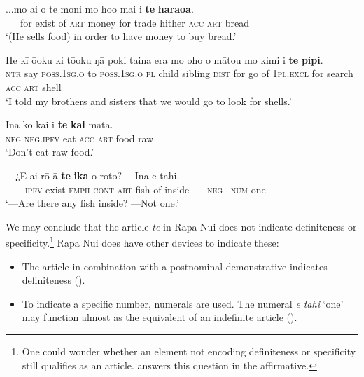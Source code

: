 \ea\label{ex:5.34}
\gll ...mo ai o te moni mo ho{\ꞌ}o mai i \textbf{te} \textbf{haraoa}. \\
~~~for exist of \textsc{art} money for trade hither \textsc{acc} \textsc{art} bread \\

\glt 
‘(He sells food) in order to have money to buy bread.’ \textstyleExampleref{[R156.023]} 
\z

\ea\label{ex:5.35}
\gll He kī ō{\ꞌ}oku ki tō{\ꞌ}oku ŋā poki taina era mo oho o mātou mo kimi i \textbf{te} \textbf{pipi}.\\
\textsc{ntr} say \textsc{poss.1sg.o} to \textsc{poss.1sg.o} \textsc{pl} child sibling \textsc{dist} for go of \textsc{1pl.excl} for search \textsc{acc} \textsc{art} shell\\

\glt 
‘I told my brothers and sisters that we would go to look for shells.’ \textstyleExampleref{[R125.002]} 
\z

\ea\label{ex:5.36}
\gll {\ꞌ}Ina ko kai i \textbf{te} \textbf{kai} mata. \\
\textsc{neg} \textsc{neg.ipfv} eat \textsc{acc} \textsc{art} food raw \\

\glt 
‘Don’t eat raw food.’  
\z

\ea\label{ex:5.37}
\gll —¿E ai rō {\ꞌ}ā \textbf{te} \textbf{ika} o roto? —{\ꞌ}Ina e tahi. \\
~~~~\textsc{ipfv} exist \textsc{emph} \textsc{cont} \textsc{art} fish of inside ~~~\textsc{neg~} \textsc{num} one \\

\glt
‘—Are there any fish inside? —Not one.’ \textstyleExampleref{[R241.058]} 
\z

We may conclude that the article \textit{te} in Rapa Nui does not indicate definiteness or specificity.\footnote{\label{fn:252}One could wonder whether an element not encoding definiteness or specificity still qualifies as an article. \citet[157]{Dryer2007Noun} answers this question in the affirmative.} Rapa Nui does have other devices to indicate these:

\begin{itemize}
\item 
The article in combination with a postnominal demonstrative indicates definiteness (). 

\item 
To indicate a specific number, numerals are used. The numeral \textit{e tahi} ‘one’ may function almost as the equivalent of an indefinite article ().

\end{itemize}

